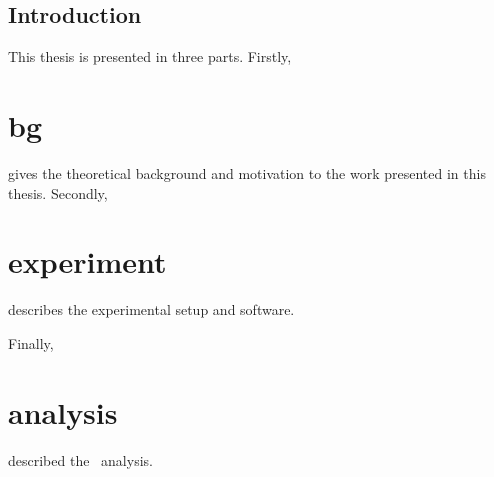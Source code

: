 \graphicspath{{Chapters/Introduction/Figures/}}

\chapter*{Introduction}
\label{chap:Introduction}

This thesis is presented in three parts. Firstly, \part{bg} gives the theoretical background
and motivation to the work presented in this thesis.
Secondly, \part{experiment} describes the experimental setup and software.

Finally, \part{analysis} described the \ZZ\ analysis.

